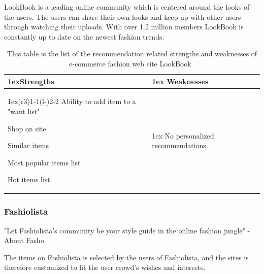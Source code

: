     LookBook is a leading online community which is centered around the looks of the users.
    The users can share their own looks and keep up with other users through watching their uploads.
    With over 1.2 million members LookBook is constantly up to date on the newest fashion trends.
    \begin{table}[H]
                \centering
                \begin{tabularx}{\linewidth}{>{\parskip1ex}X@{\kern4\tabcolsep}>{\parskip1ex}X}
                \toprule
                \hfil\bfseries Strengths
                &
                \hfil\bfseries Weaknesses
                \\\cmidrule(r{3\tabcolsep}){1-1}\cmidrule(l{-\tabcolsep}){2-2}
                Ability to add item to a "want list" \par
                Shop on site \par
                Similar items \par
                Most popular items list \par
                Hot items list \par
             	&
                No personalized recommendations \par
             	\\ \bottomrule
        \end{tabularx}
        \caption[Recommendation related strengths and weaknesses of LookBook~\cite{LookBook}]{This table is the list of the recommendation related strengths and weaknesses of e-commerce fashion web site LookBook~\cite{LookBook}}
        \label{table:ecommenreceLookBook}
    \end{table}

\subsubsection{Fashiolista} %
\label{par:fashiolista}
    "Let Fashiolista's community be your style guide in the online fashion jungle" - About Fasho~\cite{Fashiolista}

    The items on Fashiolista is selected by the users of Fashiolista, and the sites is therefore customized to fit the user crowd's wishes and interests.

